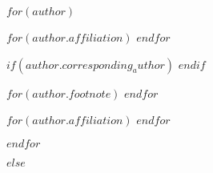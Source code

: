 $for(author)$

$for(author.affiliation)$
$endfor$

$if(author.corresponding_author)$
\makeatletter{}\makeatother
$endif$

$for(author.footnote)$
$endfor$

\author[%
$for(author.affiliation)$
\addrlblbycode{$author.affiliation$}%
$sep$,%
$endfor$
$if(author.corresponding_author)$
$if(author.affiliation)$,$endif$%
\makeatletter\anotelblbycode{$author.name$@CORRESP}\makeatother
$endif$
$if(author.footnote)$
$if(author.corresponding_author)$,$elseif(author.affiliation)$,$endif$%
$for(author.footnote)$
$$\anotelblbycode{$author.footnote$}$$%
$sep$,%
$endfor$
$endif$
]{$author.name$}

$for(author.affiliation)$
$endfor$

$endfor$

$else$ %

\usepackage{etoolbox}
\makeatletter
\patchcmd\maketitle{\def\@makefnmark{\rlap{\@textsuperscript{\normalfont\@thefnmark}}}}{}{}{}
\makeatother

\makeatletter
\def\thanksAddr#1{%
  \footnotemarkAddr\protected@xdef\@thanks{\@thanks%
        \protect\footnotetextAddr[\the \c@footnoteAddr]{#1}}%
}
\def\thanksANote#1{%
  \footnotemarkANote%
  \protected@xdef\@thanks{\@thanks%
        \protect\footnotetextANote[\the \c@footnoteANote]{#1}}%
}

\newcommand*\thanksAddrbycode[1]{%
  \ifcounter{ADDR@#1}
    {\footnotemarkAddr[\value{ADDR@#1}]}
    {\newcounter{ADDR@#1}%
     \thanksAddr{\MyRef{ADDRTXT}{#1}}%
     \setcounter{ADDR@#1}{\value{footnoteAddr}}} %
}

\newcommand*\thanksANotebycode[1]{%
  \ifcounter{ANOTE@#1}
    {\footnotemarkANote[\value{ANOTE@#1}]}
    {\newcounter{ANOTE@#1}%
     \thanksANote{\MyRef{ANOTETXT}{#1}}%
     \setcounter{ANOTE@#1}{\value{footnoteANote}}} %
}
\makeatother

